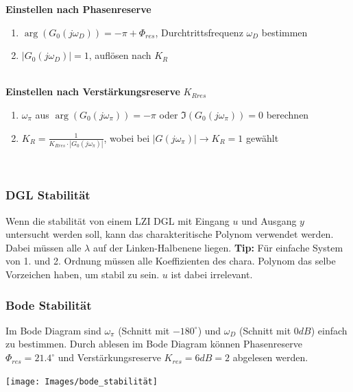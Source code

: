 \noindent\textbf{Einstellen nach Phasenreserve}
\begin{enumerate}[nosep]
	\item $\arg(G_0(j\omega_D)) = -\pi + \Phi_{res}$, Durchtrittsfrequenz $\omega_D$ bestimmen
	\item $\left|G_0(j\omega_D)\right| = 1$, auflösen nach $K_R$
\end{enumerate}
~\\
\noindent\textbf{Einstellen nach Verstärkungsreserve} $K_{Rres}$
\begin{enumerate}[nosep]
	\item $\omega_\pi$ aus $\arg(G_0(j\omega_\pi)) = -\pi$ oder $\Im(G_0(j\omega_\pi)) = 0$ berechnen
	\item $K_R = \frac{1}{K_{Rres} \cdot \left|G_0(j\omega_\pi)\right|}$,  wobei bei $\left|G(j\omega_\pi)\right| \rightarrow K_R = 1$ gewählt
\end{enumerate}~\\


\subsubsection{DGL Stabilität}
Wenn die stabilität von einem LZI DGL mit Eingang $u$ und Ausgang $y$ untersucht werden soll, kann das charakteritische Polynom verwendet werden. Dabei müssen alle $\lambda$ auf der Linken-Halbenene liegen. \textbf{Tip:} Für einfache System von 1. und 2. Ordnung müssen alle Koeffizienten des chara. Polynom das selbe Vorzeichen haben, um stabil zu sein. $u$ ist dabei irrelevant.

\subsubsection{Bode Stabilität}
 Im Bode Diagram sind $\omega_\pi$ (Schnitt mit $-180^\circ$) und $\omega_D$ (Schnitt mit $0dB$) einfach zu bestimmen. Durch ablesen im Bode Diagram können Phasenreserve $\Phi_{res} = 21.4^\circ$ und Verstärkungsreserve $K_{res} = 6dB = 2$ abgelesen werden.
\begin{center}
	\texttt{[image: Images/bode\_stabilität]}
\end{center}

